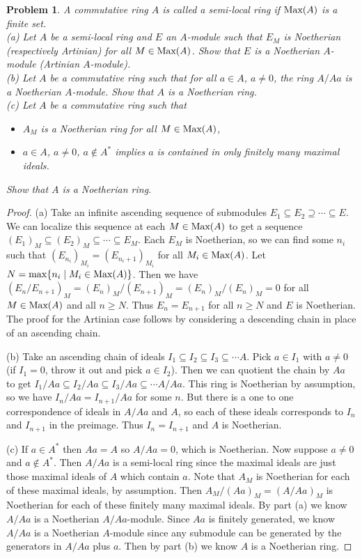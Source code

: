 \documentclass{article}
\newcommand{\Max}{\textup{Max}}
\newtheorem{problem}{Problem}
\begin{document}
\begin{problem}
A commutative ring $A$ is called a \emph{semi-local ring} if $\Max(A)$ is a finite set.\\
(a) Let $A$ be a semi-local ring and $E$ an $A$-module such that $E_M$ is Noetherian (respectively Artinian) for all $M \in \Max(A)$. Show that $E$ is a Noetherian $A$-module (Artinian $A$-module).\\
(b) Let $A$ be a commutative ring such that for all $a \in A$, $a \neq 0$, the ring $A/Aa$ is a Noetherian $A$-module. Show that $A$ is a Noetherian ring.\\
(c) Let $A$ be a commutative ring such that
\begin{itemize}
\item[i)] $A_M$ is a Noetherian ring for all $M \in \Max(A)$,
\item[ii)] $a \in A$, $a \neq 0$, $a \notin A^*$ implies $a$ is contained in only finitely many maximal ideals.
\end{itemize}
Show that $A$ is a Noetherian ring.
\end{problem}
\begin{proof}
(a) Take an infinite ascending sequence of submodules $E_1 \subseteq E_2 \supseteq \cdots \subseteq E$. We can localize this sequence at each $M \in \Max(A)$ to get a sequence $(E_1)_M \subseteq (E_2)_M \subseteq \cdots \subseteq E_M$. Each $E_M$ is Noetherian, so we can find some $n_i$ such that $(E_{n_i})_{M_i} = (E_{n_i + 1})_{M_i}$ for all $M_i \in \Max(A)$. Let $N = \max\{n_i \mid M_i \in \Max(A)\}$. Then we have $(E_n/E_{n+1})_M = (E_n)_M/(E_{n+1})_M = (E_n)_M/(E_n)_M = 0$ for all $M \in \Max(A)$ and all $n \geq N$. Thus $E_n = E_{n+1}$ for all $n \geq N$ and $E$ is Noetherian. The proof for the Artinian case follows by considering a descending chain in place of an ascending chain.

(b) Take an ascending chain of ideals $I_1 \subseteq I_2 \subseteq I_3 \subseteq \cdots A$. Pick $a \in I_1$ with $a \neq 0$ (if $I_1 = 0$, throw it out and pick $a \in I_2$). Then we can quotient the chain by $Aa$ to get $I_1/Aa \subseteq I_2/Aa \subseteq I_3/Aa \subseteq \cdots A/Aa$. This ring is Noetherian by assumption, so we have $I_n/Aa = I_{n+1}/Aa$ for some $n$. But there is a one to one correspondence of ideals in $A/Aa$ and $A$, so each of these ideals corresponds to $I_n$ and $I_{n+1}$ in the preimage. Thus $I_n = I_{n+1}$ and $A$ is Noetherian.

(c) If $a \in A^*$ then $Aa = A$ so $A/Aa = 0$, which is Noetherian. Now suppose $a \neq 0$ and $a \notin A^*$. Then $A/Aa$ is a semi-local ring since the maximal ideals are just those maximal ideals of $A$ which contain $a$. Note that $A_M$ is Noetherian for each of these maximal ideals, by assumption. Then $A_M/(Aa)_M = (A/Aa)_M$ is Noetherian for each of these finitely many maximal ideals. By part (a) we know $A/Aa$ is a Noetherian $A/Aa$-module. Since $Aa$ is finitely generated, we know $A/Aa$ is a Noetherian $A$-module since any submodule can be generated by the generators in $A/Aa$ plus $a$. Then by part (b) we know $A$ is a Noetherian ring.
\end{proof}
\end{document}
